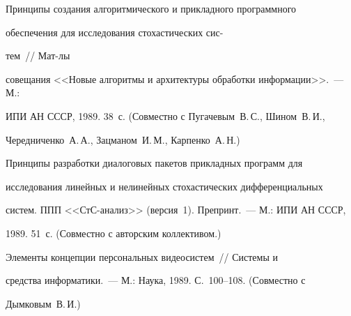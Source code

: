 

\vspace*{-3pt}





 Принципы создания алгоритмического и прикладного программного


обеспечения для исследования стохастических сис-\linebreak


\vspace*{-12pt}





\pagebreak





\noindent


тем~// Мат-лы


совещания <<Новые алгоритмы и архитектуры обработки информации>>.~--- М.:


ИПИ АН СССР, 1989. 38~с. (Совместно с Пугачевым~В.\,С., Шином~В.\,И.,


Чередни\-чен\-ко~А.\,А., Зацманом~И.\,М., Карпенко~А.\,Н.)





 Принципы разработки диалоговых пакетов прикладных программ для


исследования линейных и нелинейных стохастических дифференциальных


систем. ППП <<СтС-анализ>> (версия~1). Препринт.~--- М.: ИПИ АН СССР,


1989. 51~с. (Совместно с авторским коллективом.)





 Элементы концепции персональных видеосистем~// Системы и


средства информатики.~--- М.: Наука, 1989. С.~100--108. (Совместно с


Дымковым~В.\,И.)
















